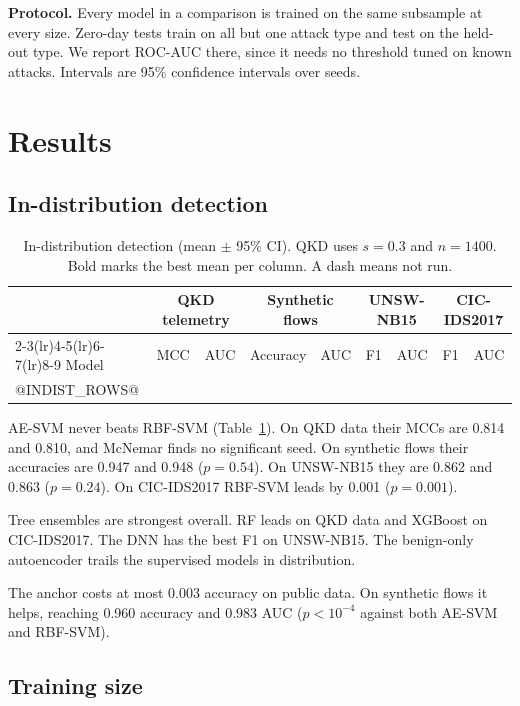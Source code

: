 \documentclass[journal]{IEEEtran}
\begin{document}
\textbf{Protocol.} Every model in a comparison is trained on the same subsample at
every size. Zero-day tests train on all but one attack type and test on the held-out
type. We report ROC-AUC there, since it needs no threshold tuned on known attacks.
Intervals are 95\% confidence intervals over seeds.

\section{Results}
\label{sec:results}

\subsection{In-distribution detection}
\label{sec:res-indist}

\begin{table}[t]
  \centering
  \caption{In-distribution detection (mean $\pm$ 95\% CI). QKD uses $s=0.3$ and $n=1400$. Bold marks the best mean per column. A dash means not run.}
  \label{tab:indist}
  \scriptsize
  \setlength{\tabcolsep}{3.2pt}
  \begin{tabular}{lcccccccc}
    \toprule
    & \multicolumn{2}{c}{QKD telemetry} & \multicolumn{2}{c}{Synthetic flows} & \multicolumn{2}{c}{UNSW-NB15} & \multicolumn{2}{c}{CIC-IDS2017} \\
    \cmidrule(lr){2-3}\cmidrule(lr){4-5}\cmidrule(lr){6-7}\cmidrule(lr){8-9}
    Model & MCC & AUC & Accuracy & AUC & F1 & AUC & F1 & AUC \\
    \midrule
@INDIST_ROWS@
    \bottomrule
  \end{tabular}
\end{table}

AE-SVM never beats RBF-SVM (Table~\ref{tab:indist}). On QKD data their MCCs are
0.814 and 0.810, and McNemar finds no significant seed. On synthetic flows their
accuracies are 0.947 and 0.948 ($p=0.54$). On UNSW-NB15 they are 0.862 and 0.863
($p=0.24$). On CIC-IDS2017 RBF-SVM leads by 0.001 ($p=0.001$).

Tree ensembles are strongest overall. RF leads on QKD data and XGBoost on
CIC-IDS2017. The DNN has the best F1 on UNSW-NB15. The benign-only autoencoder
trails the supervised models in distribution.

The anchor costs at most 0.003 accuracy on public data. On synthetic flows it
helps, reaching 0.960 accuracy and 0.983 AUC ($p<10^{-4}$ against both AE-SVM and
RBF-SVM).

\subsection{Training size}
\label{sec:res-matched}
\end{document}
